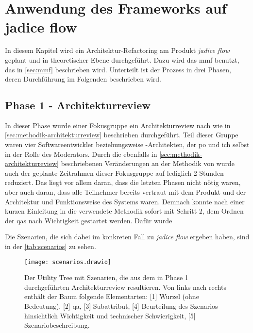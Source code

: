 \chapter{Anwendung des Frameworks auf jadice flow}
\label{chap:anwendung}

In diesem Kapitel wird ein Architektur-Refactoring am Produkt \emph{jadice flow} geplant und in theoretischer Ebene durchgeführt.
Dazu wird das \gls{mmf} benutzt, das in \cref{sec:mmf} beschrieben wird.
Unterteilt ist der Prozess in drei Phasen, deren Durchführung im Folgenden beschrieben wird.

\section{Phase 1 - Architekturreview}

In dieser Phase wurde einer Fokusgruppe ein Architekturreview nach  wie in \cref{sec:methodik-architekturreview} beschrieben durchgeführt.
Teil dieser Gruppe waren vier Softwareentwickler beziehungsweise -Architekten, der \acrlong{po} und ich selbst in der Rolle des Moderators.
Durch die ebenfalls in \cref{sec:methodik-architekturreview} beschriebenen Veränderungen an der Methodik von  wurde auch der geplante Zeitrahmen dieser Fokusgruppe auf lediglich 2 Stunden reduziert. Das liegt vor allem daran, dass die letzten Phasen nicht nötig waren, aber auch daran, dass alle Teilnehmer bereits vertraut mit dem Produkt und der Architektur und Funktionsweise des Systems waren. 
Demnach konnte nach einer kurzen Einleitung in die verwendete Methodik sofort mit Schritt 2, dem Ordnen der \glspl{qa} nach Wichtigkeit gestartet werden.
Dafür wurde 

Die Szenarien, die sich dabei im konkreten Fall zu \emph{jadice flow} ergeben haben, sind in der \cref{tab:scenarios} zu sehen.

\begin{landscape}
	\begin{figure}
		\centering
		\texttt{[image: scenarios.drawio]}
		\caption[Utility Tree mit im Architekturreview ermittelten Qualitätsanforderungen und Szenarien]{
			Der Utility Tree mit Szenarien, die aus dem in Phase 1 durchgeführten Architekturreview resultieren.
			Von links nach rechts enthält der Baum folgende Elementarten: [1] Wurzel (ohne Bedeutung), [2] \gls{qa}, [3] Subattribut, [4] Beurteilung des Szenarios hinsichtlich Wichtigkeit und technischer Schwierigkeit, [5] Szenariobeschreibung.
		}
		\label{fig:scenarios}
	\end{figure}
\end{landscape}


